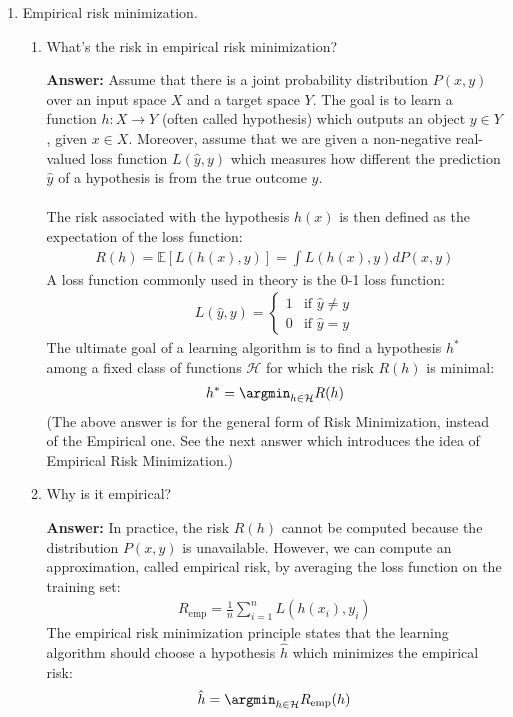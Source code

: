 \documentclass{article}
\newenvironment{QandA}{\begin{enumerate}[label=\arabic*.]}{\end{enumerate}}
\newenvironment{InnerQandA}{\begin{enumerate}[label=\roman*.]}{\end{enumerate}}
\newenvironment{answer}{\par\normalfont \textbf{Answer:}}{}
\newcommand{\Exp}[1]{\mathbb{E}\left[ #1 \right]}
\begin{document}
\begin{QandA}
    \item Empirical risk minimization.
    \begin{InnerQandA}
        \item What’s the risk in empirical risk minimization? 
        \begin{answer}
            Assume that there is a joint probability distribution $P(x, y)$ over an input space $X$ and a target space $Y$. The goal is to learn a function $h: X \rightarrow Y$ (often called hypothesis) which outputs an object $y \in Y$, given $x \in X$. Moreover, assume that we are given a non-negative real-valued loss function $L(\hat{y}, y)$ which measures how different the prediction $\hat{y}$ of a hypothesis is from the true outcome $y$. \\\\
            The risk associated with the hypothesis $h(x)$ is then defined as the expectation of the loss function:
            \begin{align*}
                R(h) = \Exp{L(h(x), y)} = \int L(h(x), y) dP(x, y)
            \end{align*}
            A loss function commonly used in theory is the 0-1 loss function:
            \begin{align*}
                L(\hat{y}, y) = \begin{cases}
                    1 &\text{if } \hat{y} \neq y \\
                    0 &\text{if } \hat{y} = y
                \end{cases}
            \end{align*}
            The ultimate goal of a learning algorithm is to find a hypothesis $h^*$ among a fixed class of functions $\mathcal{H}$ for which the risk $R(h)$ is minimal:
            \begin{align*}
                h^* = \argmin_{h \in \mathcal{H}} R(h)
            \end{align*}
            (The above answer is for the general form of Risk Minimization, instead of the Empirical one. See the next answer which introduces the idea of Empirical Risk Minimization.)
        \end{answer}

        \item Why is it empirical?
        \begin{answer}
            In practice, the risk $R(h)$ cannot be computed because the distribution $P(x, y)$ is unavailable. However, we can compute an approximation, called empirical risk, by averaging the loss function on the training set:
            \begin{align*}
                R_{\text{emp}} = \frac{1}{n}\sum_{i=1}^n L(h(x_i), y_i) 
            \end{align*}
            The empirical risk minimization principle states that the learning algorithm should choose a hypothesis $\hat{h}$ which minimizes the empirical risk:
            \begin{align*}
                \hat{h} = \argmin_{h \in \mathcal{H}} R_{\text{emp}}(h)
            \end{align*}
        \end{answer}


\end{InnerQandA}
\end{QandA}
\end{document}

